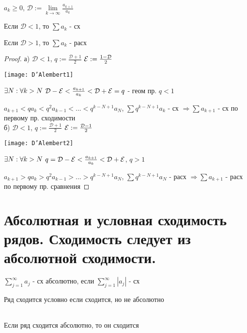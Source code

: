 \documentclass[12pt, fleqn]{article}
\begin{document}
\begin{Property}[3]
\begin{Property}[4]
\begin{Property}[2, аддитивность]
\begin{theorem} 
    $a_k \geqslant 0$, $\mathcal{D}:=\lim\limits_{k \rightarrow \infty} \frac{a_{k+1}}{a_k}$
    
    Если $\mathcal{D} < 1$, то $\sum a_k$ - сх
    
    Если $\mathcal{D} > 1$, то $\sum a_k$ - расх
\end{theorem}

\begin{proof}
    а) $\mathcal{D} < 1$, $q := \frac{\mathcal{D} + 1}{2}$ $\mathcal{E} := \frac{1 - \mathcal{D}}{2}$
    
    \texttt{[image: D'Alembert1]}
    
    $\exists N: \forall k>N$ $\mathcal{D}-\mathcal{E} < \frac{a_{k+1}}{a_k} < \mathcal{D}+\mathcal{E} = q$ - геом пр. $q < 1$
    
    $a_{k+1} < q a_k < q^2 a_{k-1} < ... < q^{k-N+1} a_N$, $\sum q^{k-N+1} a_k$ - сх $\Rightarrow \sum a_{k+1}$ - сх по первому пр. сходимости
    \\
    б) $\mathcal{D} < 1$, $q := \frac{\mathcal{D} + 1}{2}$ $\mathcal{E} := \frac{\mathcal{D} - 1}{2}$
    
    \texttt{[image: D'Alembert2]}
    
    $\exists N: \forall k>N$ $q = \mathcal{D}-\mathcal{E} < \frac{a_{k+1}}{a_k} < \mathcal{D}+\mathcal{E}$, $q > 1$
    
    $a_{k+1}> q a_k > q^2 a_{k-1} > ... >q^{k-N+1} a_N$, $\sum q^{k-N+1} a_N$ - расх $\Rightarrow \sum a_{k+1}$ - расх по первому пр. сравнения
\end{proof}

\newpage
\section{Абсолютная и условная сходимость рядов. Сходимость следует из абсолютной сходимости.}

\begin{definition}
    $\sum\limits_{j=1}^\infty a_j$ - сх абсолютно, если $\sum\limits_{j=1}^\infty |a_j|$ - сх
\end{definition}

\begin{definition}
    Ряд сходится условно если сходится, но не абсолютно
\end{definition}

\begin{theorem}\ \\
    Если ряд сходится абсолютно, то он сходится
\end{theorem}


\end{Property}
\end{Property}
\end{Property}
\end{document}
